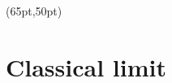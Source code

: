 \documentclass[aspectratio=169]{beamer}
\begin{document}
\begin{frame}
\begin{columns}[T]
        \begin{column}{0.6\textwidth}
            \begin{overlayarea}{\textwidth}{0.55\textheight}
                \vspace*{0.05ex}
            \end{overlayarea}
        \end{column}
        
    \end{columns}

    \begin{textblock*}{\paperwidth}(65pt,50pt)
        \noindent
    \end{textblock*}
  
\end{frame}

\section{Classical limit}
\end{document}
